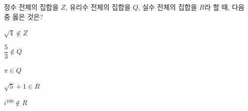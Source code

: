 정수 전체의 집합을 $Z$, 유리수 전체의 집합을 $Q$, 실수 전체의 집합을 $R$라 할 때, 다음 중 옳은 것은? 
\begin{choices32}{\rule[-3ex]{0pt}{8ex}$\sqrt{4}\notin Z$}{\rule[-3ex]{0pt}{8ex}$\dfrac{5}{3}\notin Q$}{\rule[-3ex]{0pt}{8ex}$\pi\in Q$}{\rule[-3ex]{0pt}{8ex}$\sqrt{5}+1\in R$}{\rule[-3ex]{0pt}{8ex}$i^{100}\notin R$}\end{choices32}
